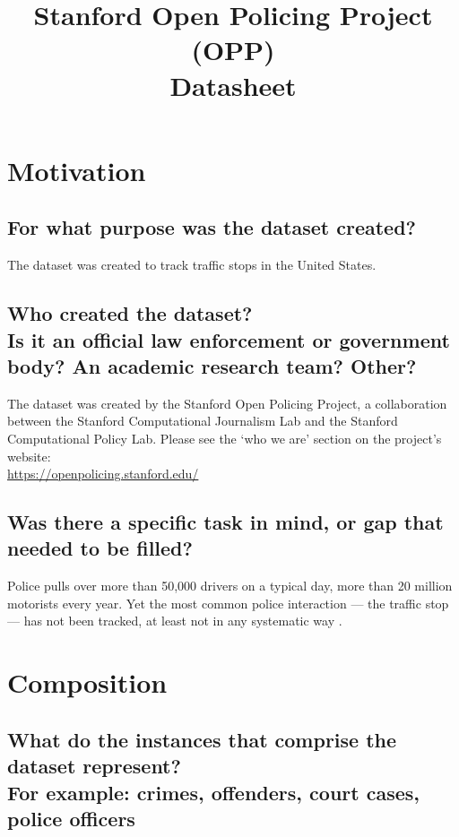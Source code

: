 \documentclass[letterpaper, 10 pt, conference]{ieeeconf}  %
\title{\LARGE \bf
Stanford Open Policing Project (OPP) \\{\color{blue}Datasheet}
}
\newcommand{\subtitle}[1]{{\\ \small \normalfont \color{purple} #1}}
\begin{document}
\maketitle
\thispagestyle{empty}
\pagestyle{empty}

\section{Motivation}

\subsection{For what purpose was the dataset created?}

The dataset was created to track traffic stops in the United States.

\subsection{Who created the dataset? \subtitle{Is it an official law enforcement or government body? An academic research team? Other?}}

The dataset was created by the Stanford Open Policing Project, a collaboration between the Stanford Computational Journalism Lab and the Stanford Computational Policy Lab. Please see the `who we are' section on the project's website: \\
\href{https://openpolicing.stanford.edu/}{https://openpolicing.stanford.edu/}

\subsection{Was there a specific task in mind, or gap that needed to be filled?}

Police pulls over more than 50,000 drivers on a typical day, more than 20 million motorists every year. Yet the most common police interaction — the traffic stop — has not been tracked, at least not in any systematic way \cite{pierson2020large}.

\section{Composition}

\subsection{What do the instances that comprise the dataset represent? \subtitle{For example: crimes, offenders, court cases, police officers}}
\end{document}
